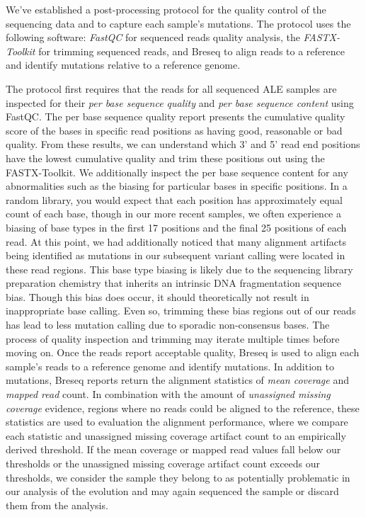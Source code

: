 \documentclass[12pt,final,masters,chapterheads]{ucsd}  %
\begin{document}
We've established a post-processing protocol for the quality control of the sequencing data and to capture each sample's mutations. The protocol uses the following software: \textit{FastQC} \cite{Andrew:2010:Online} for sequenced reads quality analysis, the \textit{FASTX-Toolkit} \cite{FASTX-Toolkit} for trimming sequenced reads, and Breseq \cite{breseq_paper} to align reads to a reference and identify mutations relative to a reference genome.

The protocol first requires that the reads for all sequenced ALE samples are inspected for their \textit{per base sequence quality} and \textit{per base sequence content} using FastQC. The per base sequence quality report presents the cumulative quality score of the bases in specific read positions as having good, reasonable or bad quality. From these results, we can understand which 3' and 5' read end positions have the lowest cumulative quality and trim these positions out using the FASTX-Toolkit. We additionally inspect the per base sequence content for any abnormalities such as the biasing for particular bases in specific positions. In a random library, you would expect that each position has approximately equal count of each base, though in our more recent samples, we often experience a biasing of base types in the first 17 positions and the final 25 positions of each read. At this point, we had additionally noticed that many alignment artifacts being identified as mutations in our subsequent variant calling were located in these read regions. This base type biasing is likely due to the sequencing library preparation chemistry that inherits an intrinsic DNA fragmentation sequence bias. Though this bias does occur, it should theoretically not result in inappropriate base calling. Even so, trimming these bias regions out of our reads has lead to less mutation calling due to sporadic non-consensus bases. The process of quality inspection and trimming may iterate multiple times before moving on. Once the reads report acceptable quality, Breseq is used to align each sample's reads to a reference genome and identify mutations. In addition to mutations, Breseq reports return the alignment statistics of \textit{mean coverage} and \textit{mapped read} count. In combination with the amount of \textit{unassigned missing coverage} evidence, regions where no reads could be aligned to the reference, these statistics are used to evaluation the alignment performance, where we compare each statistic and unassigned missing coverage artifact count to an empirically derived threshold. If the mean coverage or mapped read values fall below our thresholds or the unassigned missing coverage artifact count exceeds our thresholds, we consider the sample they belong to as potentially problematic in our analysis of the evolution and may again sequenced the sample or discard them from the analysis.
\end{document}
